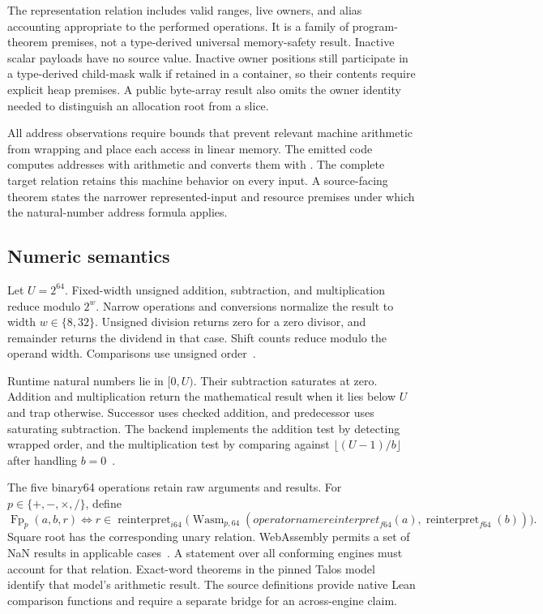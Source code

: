 \documentclass[11pt]{article}
\newcommand{\code}[1]{\texttt{\seqsplit{#1}}}
\begin{document}
The representation relation includes valid ranges, live owners, and alias accounting appropriate to the performed operations.  It is a family of program-theorem premises, not a type-derived universal memory-safety result.  Inactive scalar payloads have no source value.  Inactive owner positions still participate in a type-derived child-mask walk if retained in a container, so their contents require explicit heap premises.  A public byte-array result also omits the owner identity needed to distinguish an allocation root from a slice.

All address observations require bounds that prevent relevant machine arithmetic from wrapping and place each access in linear memory.  The emitted code computes addresses with \code{i64} arithmetic and converts them with \code{i32.wrap\_i64}.  The complete target relation retains this machine behavior on every input.  A source-facing theorem states the narrower represented-input and resource premises under which the natural-number address formula applies.

\subsection{Numeric semantics}

Let $U=2^{64}$.  Fixed-width unsigned addition, subtraction, and multiplication reduce modulo $2^w$.  Narrow operations and conversions normalize the result to width $w\in\{8,32\}$.  Unsigned division returns zero for a zero divisor, and remainder returns the dividend in that case.  Shift counts reduce modulo the operand width.  Comparisons use unsigned order~\cite{extract,binary}.

Runtime natural numbers lie in $[0,U)$.  Their subtraction saturates at zero.  Addition and multiplication return the mathematical result when it lies below $U$ and trap otherwise.  Successor uses checked addition, and predecessor uses saturating subtraction.  The backend implements the addition test by detecting wrapped order, and the multiplication test by comparing against $\lfloor(U-1)/b\rfloor$ after handling $b=0$~\cite{binary}.

The five binary64 operations retain raw \code{U64} arguments and results.  For $p\in\{+,-,\times,/\}$, define
\[
\operatorname{Fp}_p(a,b,r)
\iff
r\in\operatorname{reinterpret}_{i64}
 \bigl(\operatorname{Wasm}_{p,64}(operatorname{reinterpret}_{f64}(a),
                                \operatorname{reinterpret}_{f64}(b))\bigr).
\]
Square root has the corresponding unary relation.  WebAssembly permits a set of NaN results in applicable cases~\cite{wasm}.  A statement over all conforming engines must account for that relation.  Exact-word theorems in the pinned Talos model identify that model's arithmetic result.  The source \code{LeanExe.Float64} definitions provide native Lean comparison functions and require a separate bridge for an across-engine claim.
\end{document}
